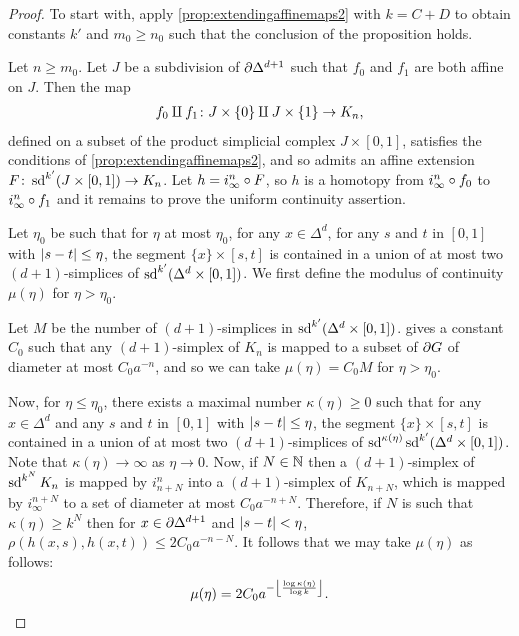 \documentclass[a4paper]{article}
\begin{document}
\begin{proof}
  To start with, apply \cref{prop:extendingaffinemaps2} with $k = C + D$ to
  obtain constants $k'$ and $m_0\geq n_0$ such that the conclusion of the
  proposition holds. 

  Let $n \geq m_0$.  Let $J$ be a subdivision of $\boundary\Delta^{d+1}$ such
  that $f_0$ and $f_1$ are both affine on $J$. Then the map 
  \begin{align*}
    f_0 \disjointunion f_1 \from J \times \{0\} \disjointunion J \times \{1\}
          \to K_n,
  \end{align*}
  defined on a subset of the product simplicial complex $J \times [0,1]$,
  satisfies the conditions of \cref{prop:extendingaffinemaps2}, and so admits
  an affine extension $F \from \sd^{k'} (J \times [0,1]) \to K_n$. Let $h =
  i^n_\infty \composed F$, so $h$ is a homotopy from $i^n_\infty\composed f_0$
  to $i^n_\infty\composed f_1$ and it remains to prove the uniform continuity
  assertion.

  Let $\eta_0$ be such that for $\eta$ at most $\eta_0$, 
  for any $x \in \Delta^d$, for any $s$ and $t$ in $[0,1]$ with
  $\abs{s-t} \leq \eta$, the segment $\{x\} \times [s,t]$ is contained in a
  union of at most two $(d+1)$-simplices of $\sd^{k'}(\Delta^d \times [0,1])$.
  We first define the modulus of continuity $\mu(\eta)$ for $\eta > \eta_0$.

  Let $M$ be the number of $(d+1)$-simplices in $\sd^{k'}(\Delta^d \times
  [0,1])$.   gives a constant $C_0$ such that any
  $(d+1)$-simplex of $K_n$ is mapped to a subset of $\boundary G$ of diameter
  at most $C_0 a^{-n}$, and so we can take $\mu(\eta) = C_0M$ for $\eta >
  \eta_0$.

  Now, for $\eta \leq \eta_0$, there exists a maximal number $\kappa(\eta) \geq
  0$ such that for any $x \in \Delta^d$ and any $s$ and $t$ in $[0,1]$ with
  $\abs{s-t} \leq \eta$, the segment $\{x\} \times [s,t]$ is contained in a
  union of at most two $(d+1)$-simplices of
  $\sd^{\kappa(\eta)}\sd^{k'}(\Delta^d\times[0,1])$. Note that $\kappa(\eta)
  \to \infty$ as $\eta \to 0$. Now, if $N\in\naturals$ then a $(d+1)$-simplex of
  $\sd^{k^N}K_n$ is mapped by $i^n_{n+N}$ into a $(d+1)$-simplex of $K_{n+N}$,
  which is mapped by $i^{n+N}_\infty$ to a set of diameter at most
  $C_0a^{-n+N}$. Therefore, if $N$ is such that $\kappa(\eta) \geq k^N$ then
  for $x \in \boundary\Delta^{d+1}$ and $\abs{s-t} < \eta$, $\rho(h(x,s),
  h(x,t)) \leq 2C_0a^{-n-N}$. It follows that we may take $\mu(\eta)$ as follows:
  \begin{align*}
    \mu(\eta) = 2C_0 a^{-\floor*{\frac{\log\kappa(\eta)}{\log k}}}.\qedhere
  \end{align*}
\end{proof}
\end{document}
